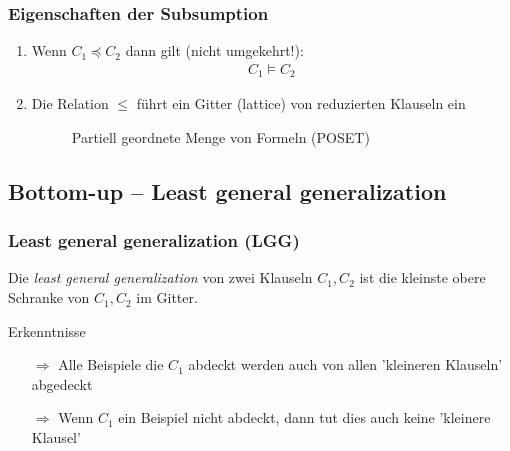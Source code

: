 \begin{frame}
	\frametitle{Eigenschaften der Subsumption}
	\begin{enumerate}
		\item {
			Wenn $C_1 \preceq C_2$ dann gilt (nicht umgekehrt!):
			\begin{align*}
				C_1 \vDash C_2
			\end{align*}
		}
		\item{ Die Relation $\leq$ führt ein Gitter (lattice) von reduzierten Klauseln ein
			\begin{figure}[H]
				\begin{center}
				\end{center}
				\caption{Partiell geordnete Menge von Formeln (POSET)}
				\label{fig:poset_atomic}
			\end{figure}
		}
	\end{enumerate}
\end{frame}

\subsection{Bottom-up -- Least general generalization}
\begin{frame}
	\frametitle{Least general generalization (LGG)}
	 Die \textit{least general generalization} von zwei Klauseln $C_1, C_2$ ist
	 die kleinste obere Schranke von $C_1,C_2$ im Gitter.

	\begin{block}{Erkenntnisse}
			\begin{itemize}
				\item [$\Rightarrow$] Alle Beispiele die $C_1$ abdeckt werden auch von
				allen 'kleineren Klauseln' abgedeckt
				\item[$\Rightarrow$] Wenn $C_1$ ein Beispiel nicht abdeckt,
				dann tut dies auch keine 'kleinere Klausel'
			\end{itemize}
	 \end{block}
\end{frame}

